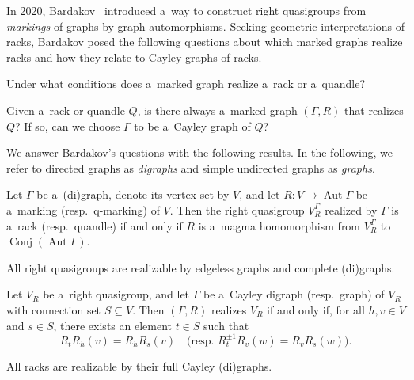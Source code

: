 \documentclass{jonasart}
\DeclareMathOperator{\Aut}{Aut}
\DeclareMathOperator{\Conj}{Conj}
\begin{document}
	In 2020, Bardakov~\cite{bardakov} introduced a~way to construct right quasigroups from \emph{markings} of graphs by graph automorphisms. Seeking geometric interpretations of racks, Bardakov posed the following questions about which marked graphs realize racks and how they relate to Cayley graphs of racks.
    
	\begin{problem}\label{prob1}
		Under what conditions does a~marked graph realize a~rack or a~quandle?
	\end{problem}

	\begin{problem}\label{prob2}
		Given a~rack or quandle $Q$, is there always a~marked graph $(\Gamma, R)$ that realizes $Q$? If so, can we choose $\Gamma$ to be a~Cayley graph of $Q$?
	\end{problem}
    
	We answer Bardakov's questions with the following results. In the following, we refer to directed graphs as \emph{digraphs} and simple undirected graphs as \emph{graphs}.
    
	\begin{theorem}
		Let $\Gamma$ be a~\textup{(}di\textup{)}graph, denote its vertex set by $V$, and let $R:V\to \Aut\Gamma$ be a~marking \textup{(}resp.\ q-marking\textup{)} of $V$. Then the right quasigroup $V^\Gamma_R$ realized by $\Gamma$ is a~rack \textup{(}resp.\ quandle\textup{)} if and only if $R$ is a~magma homomorphism from $V^\Gamma_R$ to $\Conj(\Aut \Gamma)$.
	\end{theorem}

	\begin{proposition}
		All right quasigroups are realizable by edgeless graphs and complete \textup{(}di\textup{)}graphs.
	\end{proposition}

	\begin{theorem}
		Let $V_R$ be a~right quasigroup, and let $\Gamma$ be a~Cayley digraph \textup{(}resp.\ graph\textup{)} of $V_R$ with connection set $S\subseteq V$. Then $(\Gamma,R)$ realizes $V_R$ if and only if, for all $h,v\in V$ and $s\in S$, there exists an element $t\in S$ such that
		\[
			R_t R_h (v)=R_h R_s (v) \quad
            \text{(resp. } R_t^{\pm 1}R_v (w)=R_v R_s (w) \text{)}.
		\]
	\end{theorem}

	\begin{corollary}
		All racks are realizable by their full Cayley \textup{(}di\textup{)}graphs.
	\end{corollary}
    
\end{document}
